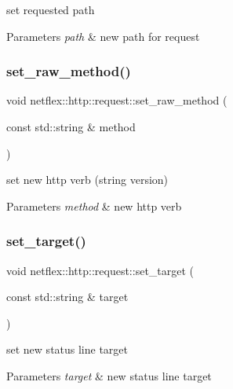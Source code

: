 set requested path


\begin{DoxyParams}{Parameters}
{\em path} & new path for request \\
\hline
\end{DoxyParams}
\mbox{\label{classnetflex_1_1http_1_1request_ad7e544191ac0fc2b97460265bccb4353}} 
\subsubsection{\texorpdfstring{set\+\_\+raw\+\_\+method()}{set\_raw\_method()}}
{\footnotesize\ttfamily void netflex\+::http\+::request\+::set\+\_\+raw\+\_\+method (\begin{DoxyParamCaption}\item[{const std\+::string \&}]{method }\end{DoxyParamCaption})}

set new http verb (string version)


\begin{DoxyParams}{Parameters}
{\em method} & new http verb \\
\hline
\end{DoxyParams}
\mbox{\label{classnetflex_1_1http_1_1request_ab8d678abf27538c7b3d7aade35496b06}} 
\subsubsection{\texorpdfstring{set\+\_\+target()}{set\_target()}}
{\footnotesize\ttfamily void netflex\+::http\+::request\+::set\+\_\+target (\begin{DoxyParamCaption}\item[{const std\+::string \&}]{target }\end{DoxyParamCaption})}

set new status line target


\begin{DoxyParams}{Parameters}
{\em target} & new status line target \\
\hline
\end{DoxyParams}
\mbox{\label{classnetflex_1_1http_1_1request_a8bc2a51ee9d86cdea633adf8fd22261c}} 
